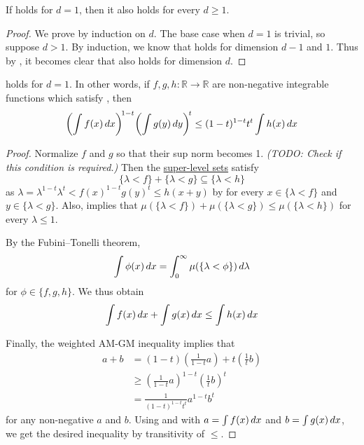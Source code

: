 \begin{corollary}
    If  holds for $d=1$, then it also holds for every $d\geq 1$.
\end{corollary}
\begin{proof}
    We prove by induction on $d$.
    The base case when $d=1$ is trivial, so suppose $d>1$.
    By induction, we know that  holds for dimension $d-1$ and $1$.
    Thus by , it becomes clear that  also holds for dimension $d$.
\end{proof}

\begin{lemma}
     holds for $d=1$. In other words,
    if $f,g,h:\mathbb{R}\to\mathbb{R}$ are non-negative integrable functions which satisfy ,
    then
    \[\biggl( \int f(x) \mathop{d\!} x \biggr)^{\!1-t} \biggl( \int g(y) \mathop{d\!} y \biggr)^{\!t} \le (1-t)^{1-t} t^{t} \int h(x) \mathop{d\!} x\]
\end{lemma}
\begin{proof}
    Normalize $f$ and $g$ so that their sup norm becomes 1.
    \textit{(TODO: Check if this condition is required.)}
    Then the \href{https://en.wikipedia.org/wiki/Level_set}{super-level sets} satisfy
    \[\{\lambda<f\}+\{\lambda<g\}\subseteq\{\lambda<h\}\]
    as $\lambda=\lambda^{1-t}\lambda^{t}<f(x)^{1-t}g(y)^{t}\leq h(x+y)$ by  for every $x\in \{\lambda<f\}$ and $y\in\{\lambda<g\}$.
    Also,  implies that $\mu(\{\lambda<f\})+\mu(\{\lambda<g\})\leq\mu(\{\lambda<h\})$ for every $\lambda\leq 1$.

    By the Fubini--Tonelli theorem,
    \[\int\phi(x)\mathop{d\!} x=\int_{0}^{\infty}\mu(\{\lambda<\phi\})\mathop{d\!} \lambda\]
    for $\phi\in\{f,g,h\}$.
    We thus obtain
    \begin{equation}
        \label{claim:int-ineq}
        \int f(x)\mathop{d\!} x+\int g(x)\mathop{d\!} x\leq \int h(x)\mathop{d\!} x
    \end{equation}

    Finally, the weighted AM-GM inequality implies that
    \begin{equation}
        \label{claim:am-gm-coro}
        \begin{split}
            a+b
            &=(1-t)\left(\frac{1}{1-t}a\right)+t\left(\frac{1}{t}b\right)\\
            &\ge \left(\frac{1}{1-t}a\right)^{1-t}\left(\frac{1}{t}b\right)^{t}\\
            &=\frac{1}{(1-t)^{1-t}t^{t}}a^{1-t}b^{t}
        \end{split}
    \end{equation}
    for any non-negative $a$ and $b$.
    Using  and  with $a=\int f(x)\mathop{d\!} x$ and $b=\int g(x)\mathop{d\!} x$, we get the desired inequality by transitivity of $\leq$.
\end{proof}
